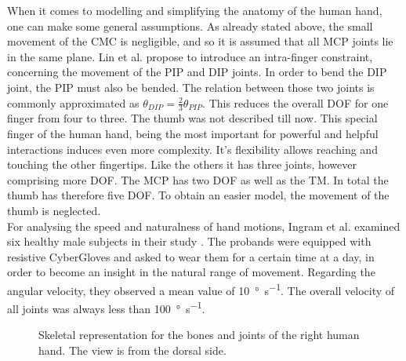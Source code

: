 When it comes to modelling and simplifying the anatomy of the human hand, one can make some general assumptions. As already stated above, the small movement of the \ac{CMC} is negligible, and so it is assumed that all \ac{MCP} joints lie in the same plane. Lin et al. propose to introduce an intra-finger constraint, concerning the movement of the \ac{PIP} and \ac{DIP} joints. In order to bend the \ac{DIP} joint, the \ac{PIP} must also be bended. The relation between those two joints is commonly approximated as $ \theta_{DIP} = \frac{2}{3} \theta_{PIP} $. This reduces the overall \ac{DOF} for one finger from four to three. The thumb was not described till now. This special finger of the human hand, being the most important for powerful and helpful interactions induces even more complexity. It's flexibility allows reaching and touching the other fingertips. Like the others it has three joints, however comprising more \ac{DOF}. The \ac{MCP} has two \ac{DOF} as well as the \ac{TM}. In total the thumb has therefore five \ac{DOF}. To obtain an easier model, the movement of the thumb is neglected.\\
For analysing the speed and naturalness of hand motions, Ingram et al. examined six healthy male subjects in their study \cite{ingram2008statistics}. The probands were equipped with resistive CyberGloves and asked to wear them for a certain time at a day, in order to become an insight in the natural range of movement. Regarding the angular velocity, they observed a mean value of \SI[per-mode=symbol]{10}{\degree \per \second}. The overall velocity of all joints was always less than \SI[per-mode=symbol]{100}{\degree \per \second}.


\begin{figure}[h]
\centering
	\hfill
\caption[Bone and joint definitions of the human hand.]{Skeletal representation for the bones and joints of the right human hand. The view is from the dorsal side.\cite{bullock2012assessing}}
\label{fig:skeletHand}
\end{figure}

